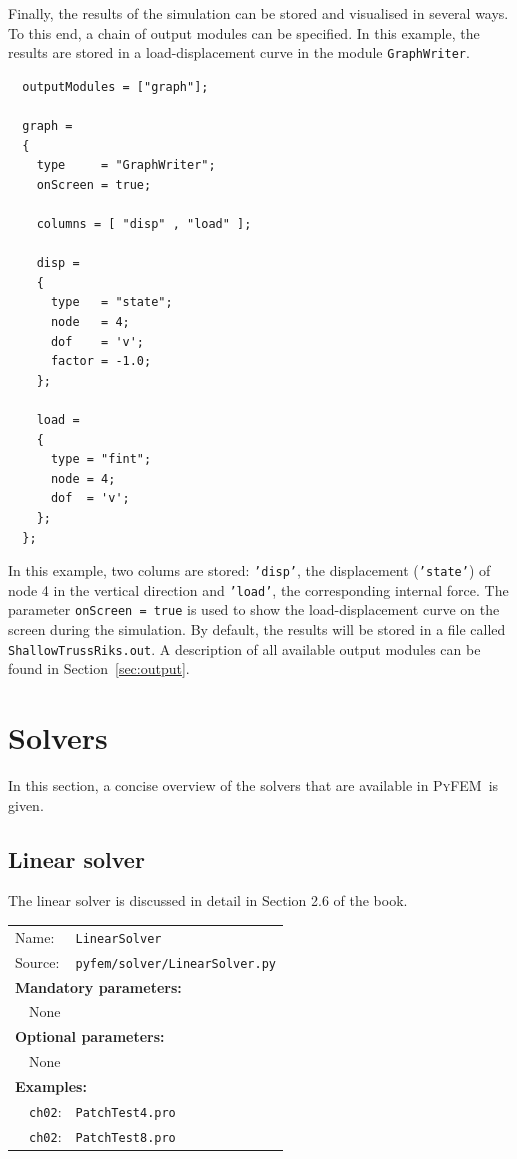 \documentclass{article}
\newcommand{\progname}{\textsc{PyFEM}}
\newenvironment{graybox}{

\begin{center}\noindent\ignorespaces\begin{Sbox}\begin{minipage}{10cm}}%
{\end{minipage}\end{Sbox}%
\fcolorbox{black}{mygray}{\TheSbox}\vspace{5mm}\ignorespacesafterend\end{center}}
\begin{document}
Finally, the results of the simulation can be stored and visualised in several ways. To this end, a chain of output modules can be 
specified. In this example, the results are stored in a load-displacement curve in the module \texttt{GraphWriter}.

\begin{graybox}
\begin{verbatim}
  outputModules = ["graph"];

  graph =
  {
    type     = "GraphWriter";
    onScreen = true;

    columns = [ "disp" , "load" ];

    disp =
    {
      type   = "state";
      node   = 4;
      dof    = 'v';
      factor = -1.0;
    };
  
    load =
    { 
      type = "fint";
      node = 4;
      dof  = 'v';
    };
  };
\end{verbatim}
\end{graybox}
In this example, two colums are stored: \texttt{'disp'}, the displacement (\texttt{'state'}) of node 4 in the vertical 
direction and \texttt{'load'}, the corresponding internal force. The parameter \texttt{onScreen = true} is used
to show the load-displacement curve on the screen during the simulation. By default, the results will be stored in a file called
\texttt{ShallowTrussRiks.out}. A description of all available output 
modules can be found in Section~\ref{sec:output}.

\section{Solvers}\label{sec:solver}

In this section, a concise overview of the solvers that are available in \progname~is given.

\subsection{Linear solver}

The linear solver is discussed in detail in Section 2.6 of the book.

\begin{tabular}{p{20mm}p{74mm}}
Name:    & \texttt{LinearSolver} \\
Source:  & \texttt{pyfem/solver/LinearSolver.py} \\
\multicolumn{2}{l}{\textbf{Mandatory parameters:}} \\
~~None & \\
\multicolumn{2}{l}{\textbf{Optional parameters:}} \\ 
~~None & \\
\multicolumn{2}{l}{\textbf{Examples:}}\\
~~\texttt{ch02}: & \texttt{PatchTest4.pro}\\
~~\texttt{ch02}: & \texttt{PatchTest8.pro}
\end{tabular}
\end{document}

